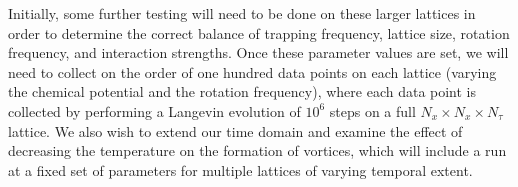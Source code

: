 \documentclass[onecolumn, 12pt]{article}
\begin{document}
Initially, some further testing will need to be done on these larger lattices in order to determine the correct balance of trapping frequency, lattice size, rotation frequency, and interaction strengths. Once these parameter values are set, we will need to collect on the order of one hundred data points on each lattice (varying the chemical potential and the rotation frequency), where each data point is collected by performing a Langevin evolution of $10^{6}$ steps on a full $N_{x} \times N_{x} \times N_{\tau}$ lattice. We also wish to extend our time domain and examine the effect of decreasing the temperature on the formation of vortices, which will include a run at a fixed set of parameters for multiple lattices of varying temporal extent. %

{}
%

\end{document}

